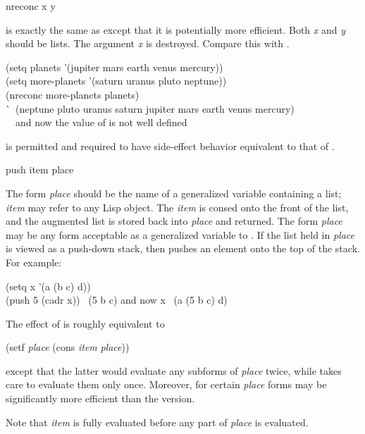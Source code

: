 \begin{defun}[Function]
nreconc x y

 is exactly the same as 
 except that it is potentially more
efficient.  Both \emph{x} and \emph{y} should be lists.
The argument \emph{x} is destroyed.
Compare this with .

\begin{lisp}
(setq planets '(jupiter mars earth venus mercury)) \\
(setq more-planets '(saturn uranus pluto neptune)) \\
(nreconc more-planets planets) \\
\`\EV\ (neptune pluto uranus saturn jupiter mars earth venus mercury) \\
~~\textrm{and now the value of  is not well defined}
\end{lisp}

 is permitted and
required to have side-effect behavior
equivalent to that of .
\end{defun}

\begin{defmac}
push item place

The form \emph{place} should be the name of a generalized variable
containing a list; \emph{item} may refer to any Lisp object.  The \emph{item}
is consed onto the front of the list, and the augmented list is stored
back into \emph{place} and returned.
The form \emph{place} may be any form acceptable as a
generalized variable to .  If the list held in \emph{place} is
viewed as a push-down stack, then  pushes an element onto the top
of the stack.
For example:
\begin{lisp}
(setq x '(a (b c) d)) \\
(push 5 (cadr x)) \EV\ (5 b c)  \textrm{and now} x \EV\ (a (5 b c) d)
\end{lisp}
The effect of 
is roughly equivalent to
\begin{lisp}
(setf \emph{place} (cons \emph{item} \emph{place}))
\end{lisp}
except that the latter would evaluate any subforms of \emph{place}
twice, while  takes care to evaluate them only once.
Moreover, for certain \emph{place} forms  may be
significantly more efficient than the  version.

Note that \emph{item} is fully evaluated before any part of \emph{place}
is evaluated.
\end{defmac}

